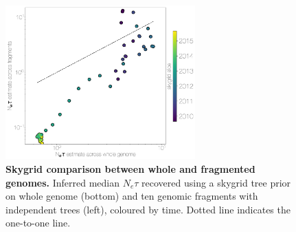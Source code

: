 \documentclass[9pt,lineno]{elife}
\begin{document}
\begin{figure}[h]
\centering
	\includegraphics[width=0.65\textwidth]{figures/mers_skygrid_comparison.png}
	\caption{\textbf{Skygrid comparison between whole and fragmented genomes.}
Inferred median $N_{e}\tau$ recovered using a skygrid tree prior on whole genome (bottom) and ten genomic fragments with independent trees (left), coloured by time.
Dotted line indicates the one-to-one line.
	}
	\label{skygrid_comparison}
\end{figure}
\end{document}
